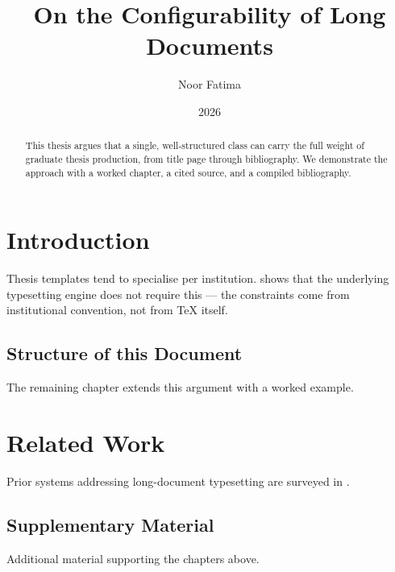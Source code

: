\documentclass[]{msu-thesis}
\title{On the Configurability of Long Documents}
\author{Noor Fatima}
\date{2026}
\begin{document}
\frontmatter
\maketitlepage

\begin{abstract}
This thesis argues that a single, well-structured class can carry the full
weight of graduate thesis production, from title page through bibliography.
We demonstrate the approach with a worked chapter, a cited source, and a
compiled bibliography.
\end{abstract}

\clearpage
\makecopyrightpage

\clearpage
\SingleSpacing
\tableofcontents*

\mainmatter

\chapter{Introduction}
Thesis templates tend to specialise per institution. \citet{knuth1984texbook}
shows that the underlying typesetting engine does not require this — the
constraints come from institutional convention, not from \TeX{} itself.

\section{Structure of this Document}
The remaining chapter extends this argument with a worked example.

\chapter{Related Work}
Prior systems addressing long-document typesetting are surveyed in
\citet{knuth1984texbook}.




\begin{appendix}
\chapter{Supplementary Material}
Additional material supporting the chapters above.
\end{appendix}
\end{document}
